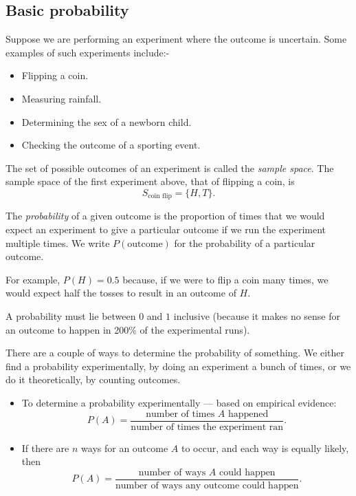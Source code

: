 
\usepackage[normalem]{ulem}
\usepackage{venndiagram}



\subsection*{Basic probability}

Suppose we are performing an experiment where the outcome is uncertain. Some examples
of such experiments include:-
\begin{itemize}
  \item Flipping a coin.
  \item Measuring rainfall.
  \item Determining the sex of a newborn child.
  \item Checking the outcome of a sporting event.
\end{itemize}

The set of possible outcomes of an experiment is called the \emph{sample space}. The
sample space of the first experiment above, that of flipping a coin, is
\begin{displaymath}
  S_\text{coin flip} = \{ H, T \}.
\end{displaymath}

The \emph{probability} of a given outcome is the proportion of times that we would expect
an experiment to give a particular outcome if we run the experiment multiple times. We
write $ P(\text{outcome}) $ for the probability of a particular outcome.

For example, $ P(H) = 0.5 $ because, if we were to flip a coin many times, we would expect
half the tosses to result in an outcome of $ H $.

A probability must lie between $ 0 $ and $ 1 $ inclusive (because it makes no sense for an outcome to happen in 200\% of the
experimental runs).

There are a couple of ways to determine the probability of something. We either find a probability experimentally,
by doing an experiment a bunch of times, or we do it theoretically, by counting outcomes.

\begin{itemize}
  \item To determine a probability experimentally --- based on empirical evidence:
        \begin{displaymath}
          P(A) = \frac{\text{number of times $A$ happened}}{\text{number of times the experiment ran}}.
        \end{displaymath}
  \item If there are $ n $ ways for an outcome $ A $ to occur, and each way is equally likely, then
        \begin{displaymath}
          P(A) = \frac{\text{number of ways $A$ could happen}}{\text{number of ways any outcome could happen}}.
        \end{displaymath}
\end{itemize}

